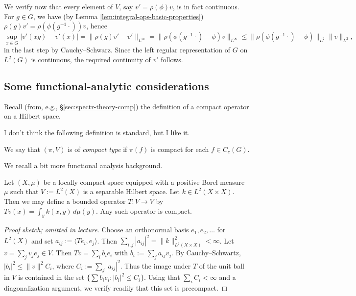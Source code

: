 \documentclass[reqno]{amsart} 
\begin{document}
We verify now that every element of $V$, say $v' = \rho(\phi) v$, is in fact continuous.  For $g \in G$, we have (by Lemma \ref{lem:integral-ops-basic-properties}) $\rho(g) v' = \rho(\phi(g^{-1} \cdot)) v$, hence
\begin{equation*}
  \sup_{x \in G} |v'(x g) - v'(x)| = \|\rho(g) v' - v'\|_{L^\infty} = \|\rho(\phi(g^{-1} \cdot) -\phi ) v\|_{L^\infty} \leq \|\rho(\phi(g^{-1} \cdot) -\phi )\|_{L^2} \| v\|_{L^2},
\end{equation*}
in the last step by Cauchy--Schwarz.  Since the left regular representation of $G$ on $L^2(G)$ is continuous, the required continuity of $v'$ follows.


\subsection{Some functional-analytic considerations}\label{sec:cnh2voskw3}

Recall (from, e.g., \S\ref{sec:spectr-theory-comp}) the definition of a compact operator on a Hilbert space.

I don't think the following definition is standard, but I like it.
\begin{definition}\label{defn:compact-type}
  We say that $(\pi,V)$ is of \emph{compact type} if $\pi(f)$ is compact for each $f \in C_c(G)$.
\end{definition}

We recall a bit more functional analysis background.
\begin{lemma}
  Let $(X,\mu)$ be a locally compact space equipped with a positive Borel measure $\mu$ such that $V := L^2(X)$ is a separable Hilbert space.  Let $k \in L^2(X \times X)$.  Then we may define a bounded operator $T : V \rightarrow V$ by $T v(x) = \int_{y} k(x,y) \, d \mu(y)$.  Any such operator is compact.
\end{lemma}
\begin{proof}
[Proof sketch; omitted in lecture]
  Choose an orthonormal basis $e_1,e_2,\dotsc$ for $L^2(X)$ and set $a_{i j} := \langle T e_i, e_j \rangle$.  Then $\sum_{i,j} |a_{i j}|^2 = \|k\|_{L^2(X \times X)}^2 < \infty$.  Let $v = \sum_j v_j e_j \in V$.  Then $T v = \sum_i b_i e_i$ with $b_i := \sum_j a_{i j} v_j$.  By Cauchy--Schwartz, $|b_i|^2 \leq \|v\|^2 C_i$, where $C_i := \sum_j |a_{i j}|^2$.  Thus the image under $T$ of the unit ball in $V$ is contained in the set $\{\sum b_i e_i : |b_i|^2 \leq C_i \}$.  Using that $\sum_i C_i < \infty$ and a diagonalization argument, we verify readily that this set is precompact.
\end{proof}
\end{document}
